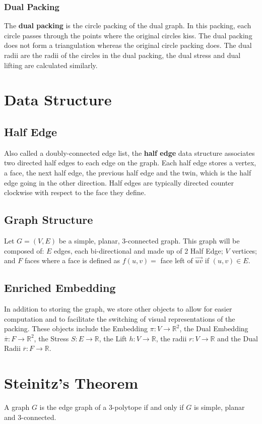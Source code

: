 \documentclass[english]{article}
\begin{document}
  \subsubsection{Dual Packing}
  The \textbf{dual packing} is the circle packing of the dual graph. 
  In this packing, each circle passes through the points where the original circles kiss. 
  The dual packing does not form a triangulation whereas the original circle packing does.
  The dual radii are the radii of the circles in the dual packing, the dual stress and dual lifting are calculated similarly.

\section{Data Structure}
 \subsection{Half Edge}
  Also called a doubly-connected edge list, the \textbf{half edge} data structure associates two directed half edges to each edge on the graph. 
  Each half edge stores a vertex, a face, the next half edge, the previous half edge and the twin, which is the half edge going in the other direction. 
  Half edges are typically directed counter clockwise with respect to the face they define.
\subsection{Graph Structure}
  Let $G=(V,E)$ be a simple, planar, 3-connected graph. This graph will be composed of: $E$ edges, each bi-directional and made up of 2 Half Edge; $V$ vertices; and $F$ faces where a face is defined as $f(u,v) =$ face left of $\overrightarrow{uv}$ if $(u,v)\in E$.
\subsection{Enriched Embedding}
  In addition to storing the graph, we store other objects to allow for easier computation and to facilitate the switching of visual representations of the packing. These objects include the Embedding $\pi : V \rightarrow \mathbb{R}^2$, the Dual Embedding $\overline{\pi} : F \rightarrow \mathbb{R}^2$, the Stress $S : E \rightarrow \mathbb{R}$, the Lift $h : V \rightarrow \mathbb{R}$, the radii $r : V \rightarrow \mathbb{R}$ and the Dual Radii $\overline{r} : F \rightarrow \mathbb{R}$.

\section{Steinitz's Theorem}
 A graph $G$ is the edge graph of a 3-polytope if and only if $G$ is simple, planar and 3-connected.
 
\end{document}
